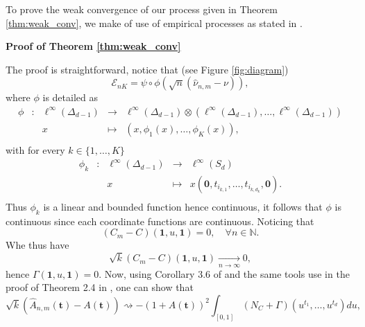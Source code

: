 \documentclass[11pt]{article}
\makeatletter
\theoremstyle{definition}
\renewenvironment{proof}[1][\proofname]{\par
\pushQED{\qed}%
\normalfont \topsep6\p@\@plus6\p@\relax
\trivlist
\item\relax
{\textbf{
#1\@addpunct{ }}}\hspace\labelsep\ignorespaces
}{%
\popQED\endtrivlist\@endpefalse
}
\makeatother
\begin{document}
	To prove the weak convergence of our process given in Theorem \ref{thm:weak_conv}, we make of use of empirical processes as stated in \cite{bestbook}.
	
	\begin{proof}[Proof of Theorem \ref{thm:weak_conv}]
		The proof is straightforward, notice that (see Figure \ref{fig:diagram})
		\begin{equation*}
			\mathcal{E}_{nK} = \psi \circ \phi \left(\sqrt{n}(\hat{\nu}_{n,m} - \nu) \right),
		\end{equation*}
		where $\phi$ is detailed as
		\begin{equation*}
			\begin{array}{ccccc}
\phi & : & \ell^{\infty}(\Delta_{d-1}) & \to & \ell^{\infty}(\Delta_{d-1}) \otimes (\ell^{\infty}(\Delta_{d-1}), \dots, \ell^{\infty}(\Delta_{d-1})) \\
 & & x & \mapsto & (x, \phi_1(x), \dots, \phi_K(x)), \\
			\end{array}
		\end{equation*}
		with for every $k\in \{1,\dots,K\}$
		\begin{equation*}
			\begin{array}{ccccc}
\phi_k & : & \ell^{\infty}(\Delta_{d-1}) & \to & \ell^{\infty}(S_{d}) \\
 & & x & \mapsto & x(\textbf{0}, t_{i_{k,1}},\dots, t_{i_{k,d_k}}, \textbf{0}). \\
			\end{array}
		\end{equation*}
		Thus $\phi_k$ is a linear and bounded function hence continuous, it follows that $\phi$ is continuous  since each coordinate functions are continuous. Noticing that 
		\begin{equation*}
			(C_m - C)(\textbf{1},u,\textbf{1}) = 0, \quad \forall n \in \mathbb{N}.
		\end{equation*}
		Whe thus have
		\begin{equation*}
			\sqrt{k}(C_m-C)(\textbf{1},u,\textbf{1}) \underset{n \rightarrow \infty}{\longrightarrow} 0,
		\end{equation*}
		hence $\Gamma(\textbf{1},u,\textbf{1}) = 0$. Now, using Corollary 3.6 of \cite{bucher2014extreme} and the same tools use in the proof of Theorem 2.4 in \cite{MARCON20171}, one can show that
		\begin{equation*}		
		 \sqrt{k}(\hat{A}_{n,m}(\textbf{t}) - A(\textbf{t})) \rightsquigarrow -\left(1+A(\textbf{t})\right)^2 \int_{[0,1]}(N_C + \Gamma)(u^{t_1}, \dots, u^{t_d}) du,

\end{equation*}
\end{proof}
\end{document}
